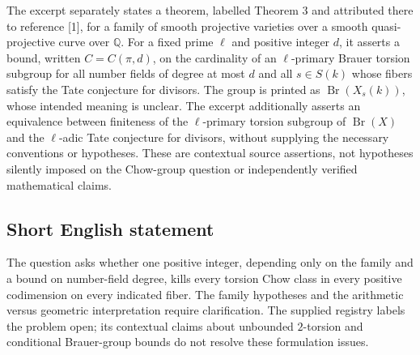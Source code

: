 \documentclass[11pt]{article}
\newcommand{\Q}{\mathbb{Q}}
\begin{document}
The excerpt separately states a theorem, labelled Theorem 3 and attributed there to reference [1], for a family of smooth projective varieties over a smooth quasi-projective curve over \(\Q\). For a fixed prime \(\ell\) and positive integer \(d\), it asserts a bound, written \(C=C(\pi,d)\), on the cardinality of an \(\ell\)-primary Brauer torsion subgroup for all number fields of degree at most \(d\) and all \(s\in S(k)\) whose fibers satisfy the Tate conjecture for divisors. The group is printed as \(\operatorname{Br}(X_s(k))\), whose intended meaning is unclear. The excerpt additionally asserts an equivalence between finiteness of the \(\ell\)-primary torsion subgroup of \(\operatorname{Br}(X)\) and the \(\ell\)-adic Tate conjecture for divisors, without supplying the necessary conventions or hypotheses. These are contextual source assertions, not hypotheses silently imposed on the Chow-group question or independently verified mathematical claims.
\subsection{Short English statement}
The question asks whether one positive integer, depending only on the family and a bound on number-field degree, kills every torsion Chow class in every positive codimension on every indicated fiber. The family hypotheses and the arithmetic versus geometric interpretation require clarification. The supplied registry labels the problem open; its contextual claims about unbounded \(2\)-torsion and conditional Brauer-group bounds do not resolve these formulation issues.
\end{document}
